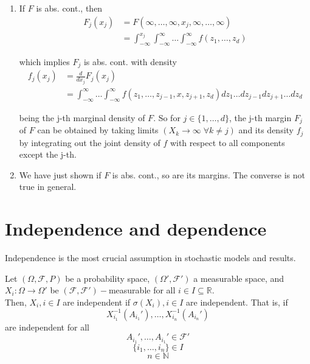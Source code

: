 \documentclass{article}
\newcommand{\R}{\mathbb{R}}
\newcommand{\N}{\mathbb{N}}
\newcommand{\inv}{^{-1}}
\begin{document}
	\begin{myrem}{}{}
		\begin{enumerate}
			\item If $F$ is abs. cont., then
				\begin{align*}
					F_j(x_j)&=F(\infty, \dots, \infty, x_j, \infty, \dots, \infty)\\
					&=\int_{-\infty}^{x_j}\int_{-\infty}^{\infty}\dots\int_{-\infty}^{\infty}f(z_1, \dots, z_d)
				\end{align*}
				
				which implies $F_j$ is abs. cont. with density
				\begin{align*}
					f_j(x_j)&=\frac{d}{dx_j}F_j(x_j)\\
					&=\int_{-\infty}^{\infty}\dots\int_{-\infty}^{\infty}f(z_1, \dots, z_{j-1}, x, z_{j+1}, z_d)dz_1\dots dz_{j-1}dz_{j+1}\dots dz_d
				\end{align*}
				
				being the j-th marginal density of $F$. So for $j\in\{1, \dots, d\}$, the j-th margin $F_j$ of $F$ can be obtained by taking limits $(X_k\to\infty\;\forall k\neq j)$ and its density $f_j$ by integrating out the joint density of $f$ with respect to all components except the j-th.
				
			\item We have just shown if $F$ is abs. cont., so are its margins. The converse is not true in general.
		\end{enumerate}
	\end{myrem}
	
	\section{Independence and dependence}
	
	Independence is the most crucial assumption in stochastic models and results.
	
	\begin{mydef}{}{}
		Let $(\Omega, \mathcal{F}, P)$ be a probability space, $(\Omega', \mathcal{F}')$ a measurable space, and $X_i : \Omega\to\Omega'$ be $(\mathcal{F}, \mathcal{F}')-$measurable for all $i\in I\subseteq\R$.\\
		
		Then, $X_i, i\in I$ are independent if $\sigma(X_i), i\in I$ are independent. That is, if $$X_{i_1}\inv(A_{i_1}'), \dots, X_{i_n}\inv(A_{i_n}')$$ are independent for all $$A_{i_1}', \dots, A_{i_1}'\in\mathcal{F}'$$ $$\{i_1, \dots, i_n\}\in I$$ $$n\in\N$$
	\end{mydef}
	
\end{document}
